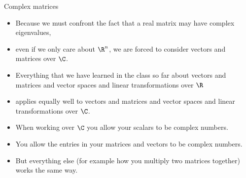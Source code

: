 \documentclass{beamer}
\begin{document}
\begin{frame}{Complex matrices}

\begin{itemize}
\item Because we must confront the fact that a real matrix may have complex eigenvalues,
\item even if we only care about $\R^n$, we are forced to consider vectors and matrices over $\C$.
\item Everything that we have learned in the class so far about vectors and matrices and vector spaces and linear transformations over $\R$
\item applies equally well to vectors and matrices and vector spaces and linear transformations over $\C$.
\item When working over $\C$ you allow your scalars to be complex numbers.
\item You allow the entries in your matrices and vectors to be complex numbers.
\item But everything else (for example how you multiply two matrices together) works the same way.
\end{itemize}
\end{frame}
\end{document}
